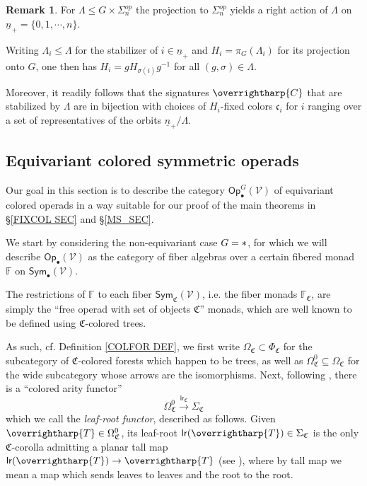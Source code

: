 \documentclass[a4paper,10pt
,draft
]{article}%
\numberwithin{equation}{section}
\numberwithin{figure}{section}
\theoremstyle{definition} %
\newtheorem{remark}[equation]{Remark}%
\newcommand{\vect}[1]{\text{\overrightharp{\ensuremath{#1}}}}
\newcommand{\V}{\ensuremath{\mathcal V}}
\newcommand{\1}{\ensuremath{\mathbbm 1}}%
\begin{document}
\begin{remark}\label{CHOOSESIGN REM}
For $\Lambda \leq G \times \Sigma_n^{op}$ 
the projection to $\Sigma_n^{op}$ yields a
right action of $\Lambda$ on 
$\underline{n}_+ = \{0,1,\cdots,n\}$.

Writing $\Lambda_i\leq \Lambda$ for the stabilizer of $i \in \underline{n}_{+}$ and $H_i = \pi_G(\Lambda_i)$
for its projection onto $G$,
one then has $H_i = g H_{\sigma(i)} g^{-1}$ for all
$(g, \sigma) \in \Lambda$.

Moreover, it readily follows that the signatures $\vect{C}$ that 
are stabilized by $\Lambda$ are in bijection with choices of 
$H_i$-fixed colors $\mathfrak{c}_i$ 
for $i$ ranging over a set of representatives of
the orbits $\underline{n}_+ /\Lambda$.
\end{remark}




\subsection{Equivariant colored symmetric operads}
\label{EQCOSYMOP SEC}

Our goal in this section is to describe the category 
$\mathsf{Op}^{G}_{\bullet}(\V)$
of equivariant colored operads in a way suitable for our 
proof of the main theorems in \S \ref{FIXCOL SEC} and \S \ref{MS_SEC}.

We start by considering the non-equivariant case
$G = \**$,
for which we will describe
$\mathsf{Op}_{\bullet}(\V)$
as the category of fiber algebras over a certain fibered monad $\mathbb{F}$ on 
$\mathsf{Sym}_\bullet(\mathcal{V})$.

The restrictions of $\mathbb{F}$ to each fiber
$\mathsf{Sym}_{\mathfrak{C}}(\V)$,
i.e. the fiber monads $\mathbb{F}_{\mathfrak{C}}$,
are simply the ``free operad with set of objects $\mathfrak{C}$'' monads,
which are well known to be defined using 
$\mathfrak{C}$-colored trees.

As such, cf. Definition \ref{COLFOR DEF},
we first write 
$\Omega_{\mathfrak{C}} \subset \Phi_{\mathfrak{C}}$
for the subcategory of $\mathfrak{C}$-colored forests which happen to be trees,
as well as 
$\Omega^0_{\mathfrak{C}} \subseteq \Omega_{\mathfrak{C}}$
for the wide subcategory whose arrows are the isomorphisms.
%
Next, following \cite[Notation 3.38]{BP_geo},
there is a ``colored arity functor''
\begin{equation}\label{LRDEF EQ}
\Omega_{\mathfrak C}^0 \xrightarrow{\mathsf{lr}_{\mathfrak C}} \Sigma_{\mathfrak{C}}
\end{equation}
which we call the \emph{leaf-root functor}, described as follows.
Given $\vect{T} \in \Omega^0_{\mathfrak{C}}$, 
its leaf-root
$\mathsf{lr}(\vect{T}) \in \Sigma_{\mathfrak{C}}$
is the only $\mathfrak{C}$-corolla
admitting a planar tall map
$\mathsf{lr}(\vect{T}) \to \vect{T}$
(see \cite[Defs. 3.21 and 3.35]{BP_geo}),
where by tall map we mean a map
which sends leaves to leaves and the root to the root.
\end{document}

